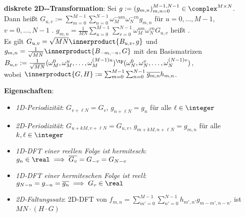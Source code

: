 \linie

\textbf{diskrete 2D--Transformation}:
Sei $g := (g_{m,n})_{m,n=0}^{M-1,N-1} \in \complex^{M \times N}$.\\
Dann heißt
$G_{u,v} := \sum_{m=0}^{M-1} \sum_{n=0}^{N-1} \omega_M^{-um} \omega_N^{-vn} g_{m,n}$ für
$u = 0, \dotsc, M - 1$, $v = 0, \dotsc, N - 1$
.
$g_{m,n} = \frac{1}{MN} \sum_{u=0}^{M-1} \sum_{v=0}^{N-1} \omega_M^{um} \omega_N^{vn} G_{u,v}$
heißt .\\
Es gilt $G_{u,v} = \sqrt{MN} \innerproduct{B_{u,v}, g}$
und $g_{m,n} = \frac{1}{\sqrt{MN}} \innerproduct{B_{-m,-n}, G}$
mit den Basismatrizen\\
$B_{u,v} := \frac{1}{\sqrt{MN}} (\omega_M^0, \omega_M^u, \dotsc, \omega_M^{(M-1)u})^\tp
(\omega_N^0, \omega_N^v, \dotsc, \omega_N^{(N-1)v})$,\\
wobei $\innerproduct{G, H} := \sum_{m=0}^{M-1} \sum_{n=0}^{N-1} \overline{g_{m,n}} h_{m,n}$.

\textbf{Eigenschaften}:
\begin{itemize}
    \item
    \vspace{-1mm}
    \emph{1D-Periodizität}:
    $G_{v+\ell N} = G_v$,
    $g_{n+\ell N} = g_n$
    für alle $\ell \in \integer$

    \item
    \vspace{-1mm}
    \emph{2D-Periodizität}:
    $G_{u+kM,v+\ell N} = G_{u,v}$,
    $g_{m+kM,n+\ell N} = g_{m,n}$
    für alle $k, \ell \in \integer$

    \item
    \vspace{-1mm}
    \emph{1D-DFT einer reellen Folge ist hermitesch}:
    $g_n \in \real \implies \overline{G_v} = G_{-v} = G_{N-v}$

    \item
    \vspace{-1mm}
    \emph{1D-DFT einer hermiteschen Folge ist reell}:
    $g_{N-n} = g_{-n} = \overline{g_n} \implies G_v \in \real$

    \item
    \vspace{-1mm}
    \emph{2D-Faltungssatz}:
    2D-DFT von $f_{m,n} = \sum_{m'=0}^{M-1} \sum_{n'=0}^{N-1} h_{m',n'} g_{m-m',n-n'}$
    ist $MN \cdot (H \cdot G)$
\end{itemize}

\pagebreak
